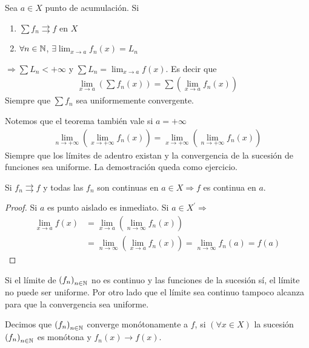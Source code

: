 \begin{corollary}
  Sea \(a \in X\) punto de acumulación. Si \begin{enumerate}
    \item \(\sum f_n \rightrightarrows f\) en \(X\)
    \item \(\forall n \in \mathbb{N} \), \(\exists \lim_{x \to a} f_n(x) = L_n\)
  \end{enumerate} \(\Rightarrow \sum L_n < +\infty \) y \(\sum L_n = \lim_{x \to a} f(x)\).
  Es decir que \begin{align*}
    \lim_{x \to a}\left(\sum f_n(x)\right) = \sum\left(\lim_{x \to a} f_n(x)\right)
  \end{align*} Siempre que \(\sum f_n\) sea uniformemente convergente.
\end{corollary}

Notemos que el teorema también vale si \(a = +\infty \)
\begin{align*}
  \lim_{n \to +\infty} \left(\lim_{x \to +\infty} f_n(x)\right) = \lim_{x \to +\infty}\left(\lim_{n \to +\infty} f_n(x)\right)
\end{align*}
Siempre que los límites de adentro existan y la convergencia de la sucesión de funciones sea uniforme. La demostración queda como ejercicio.

\begin{theorem}
  Si \(f_n \rightrightarrows f\) y todas las \(f_n\) son continuas en \(a \in X \Rightarrow f\) es continua en \(a\).
  \begin{proof}
    Si \(a\) es punto aislado es inmediato. Si \(a \in X^{\prime} \Rightarrow \) \begin{align*}
      \lim_{x \to a} f(x) & = \lim_{x \to a}\left(\lim_{n \to \infty} f_n(x)\right)                                     \\
                          & = \lim_{n \to \infty}\left(\lim_{x \to a} f_n(x)\right) = \lim_{n \to \infty} f_n(a) = f(a)
    \end{align*}
  \end{proof}
\end{theorem}

Si el límite de \({(f_n)}_{n \in \mathbb{N}} \) no es continuo y las funciones de la sucesión sí, el límite no puede ser uniforme. Por otro lado que el límite sea continuo tampoco alcanza para que la convergencia sea uniforme.

\begin{definition}
  Decimos que \({(f_n)}_{n \in \mathbb{N}} \) converge monótonamente a \(f\), si \((\forall x \in X)\) la sucesión \({(f_n)}_{n \in \mathbb{N}} \) es monótona y \(f_n(x) \to f(x)\).
\end{definition}

